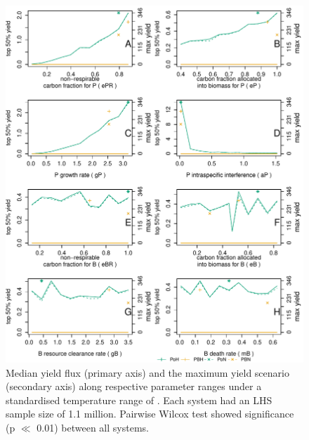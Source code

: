 \documentclass[../thesis.tex]{subfiles} %
\begin{document}
\begin{figure}[H]
    \centering
    \includegraphics[width=\linewidth]{result/yieldFlux.pdf}
    \caption[Yield flux median in biological parameter space]{Median yield flux (primary axis) and the maximum yield scenario (secondary axis) along respective parameter ranges under a standardised temperature range of \temp.  Each system had an LHS sample size of 1.1 million.  Pairwise Wilcox test showed significance (p $\ll$ 0.01) between all systems.}
    \label{f:ydByPara}
\end{figure}
\end{document}
